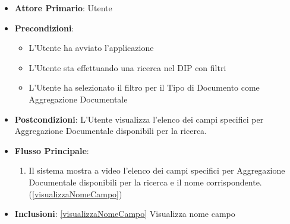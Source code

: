 \begin{itemize}
      \item \textbf{Attore Primario}: Utente
      \item \textbf{Precondizioni}: 
      \begin{itemize}
            \item L'Utente ha avviato l'applicazione
            \item L'Utente sta effettuando una ricerca nel DIP con filtri
            \item L'Utente ha selezionato il filtro per il Tipo di Documento come Aggregazione Documentale
      \end{itemize}
      \item \textbf{Postcondizioni}:  L'Utente visualizza l'elenco dei campi specifici per Aggregazione Documentale disponibili per la ricerca.
      \item \textbf{Flusso Principale}:
      \begin{enumerate}
            \item Il sistema mostra a video l'elenco dei campi specifici per Aggregazione Documentale disponibili per la ricerca e il nome corrispondente. (\ref{visualizzaNomeCampo})
      \end{enumerate}
      \item \textbf{Inclusioni}: \ref{visualizzaNomeCampo} Visualizza nome campo
\end{itemize}

